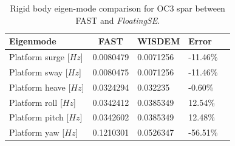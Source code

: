 \begin{table}[htbp] \begin{center}
    \caption{Rigid body eigen-mode comparison for OC3 spar between FAST and \textit{FloatingSE}.}
    \label{tbl:verify-fast}
{\small
  \begin{tabular}{ l c l l l } \hline
    \textbf{Eigenmode} & \textbf{FAST} & \textbf{WISDEM} & \textbf{Error}\\
    \hline \hline
    Platform surge [$Hz$] & 0.0080479 & 0.0071256 & -11.46\%\\
    Platform sway [$Hz$] & 0.0080475 & 0.0071256 & -11.46\% \\
    Platform heave [$Hz$] & 0.0324294 & 0.032235 & -0.60\% \\
    Platform roll [$Hz$] & 0.0342412 & 0.0385349 & 12.54\% \\
    Platform pitch [$Hz$] & 0.0342602 & 0.0385349 & 12.48\% \\
    Platform yaw [$Hz$] & 0.1210301 & 0.0526347 & -56.51\% \\
  \hline \end{tabular}
}
\end{center} \end{table}







